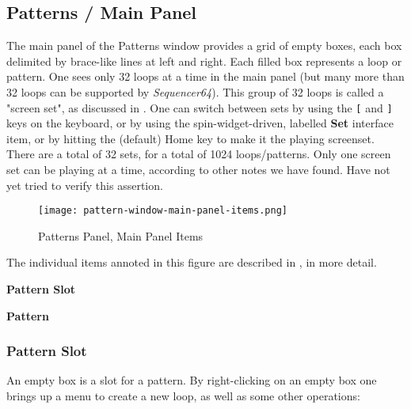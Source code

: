 \subsection{Patterns / Main Panel}
\label{subsec:seq64_patterns_panel_main}

   The main panel of the Patterns window provides a grid of empty boxes,
   each box delimited by brace-like lines at left and right.
   Each filled box represents a loop or pattern.
   One sees only 32 loops at a time in the main panel (but many more than
   32 loops can be supported by \textsl{Sequencer64}).
   This group of 32 loops is called a "screen set", as discussed in
   .
   One can switch between sets by using the
   \index{keys![}
   \texttt{[} and
   \index{keys!]}
   \texttt{]} keys on the keyboard, or by using
   the spin-widget-driven, labelled \textbf{Set} interface item, or
   by hitting the (default) Home key to make it the playing screenset.
   There are a total of 32 sets, for a total of 1024 loops/patterns. 
   Only one screen set can be playing at a time, according to other notes we
   have found.  Have not yet tried to verify this assertion.

\begin{figure}[H]
   \centering 
   \texttt{[image: pattern-window-main-panel-items.png]}
   \caption{Patterns Panel, Main Panel Items}
   \label{fig:pattern_window_main_panel_items}
\end{figure}

   The individual items annoted in this figure are described in
   , in more detail.

   \begin{enumber}
      \item \textbf{Pattern Slot}
      \item \textbf{Pattern}
   \end{enumber}

\subsubsection{Pattern Slot}
\label{subsubsec:seq64_patterns_pattern_slot}

   An empty box is a slot for a pattern.
   By right-clicking on an empty box one brings up a menu to create
   a new loop, as well as some other operations:

